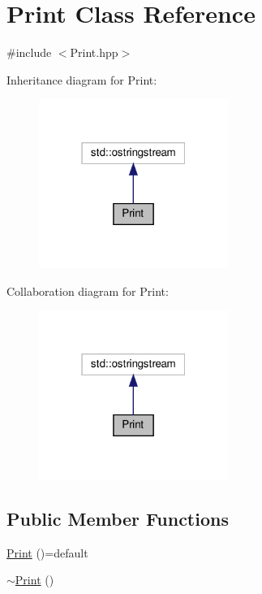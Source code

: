 \hypertarget{class_print}{}\section{Print Class Reference}
\label{class_print}


{\ttfamily \#include $<$Print.\+hpp$>$}



Inheritance diagram for Print\+:\nopagebreak
\begin{figure}[H]
\begin{center}
\leavevmode
\includegraphics[width=175pt]{class_print__inherit__graph}
\end{center}
\end{figure}


Collaboration diagram for Print\+:\nopagebreak
\begin{figure}[H]
\begin{center}
\leavevmode
\includegraphics[width=175pt]{class_print__coll__graph}
\end{center}
\end{figure}
\subsection*{Public Member Functions}
\begin{DoxyCompactItemize}
\item 
\mbox{\hyperlink{class_print_a84154f9ef258a6e0d061c049d2cd430f}{Print}} ()=default
\item 
\mbox{\hyperlink{class_print_afe336c40d17eeccba970a1db714da1b5}{$\sim$\+Print}} ()
\end{DoxyCompactItemize}
